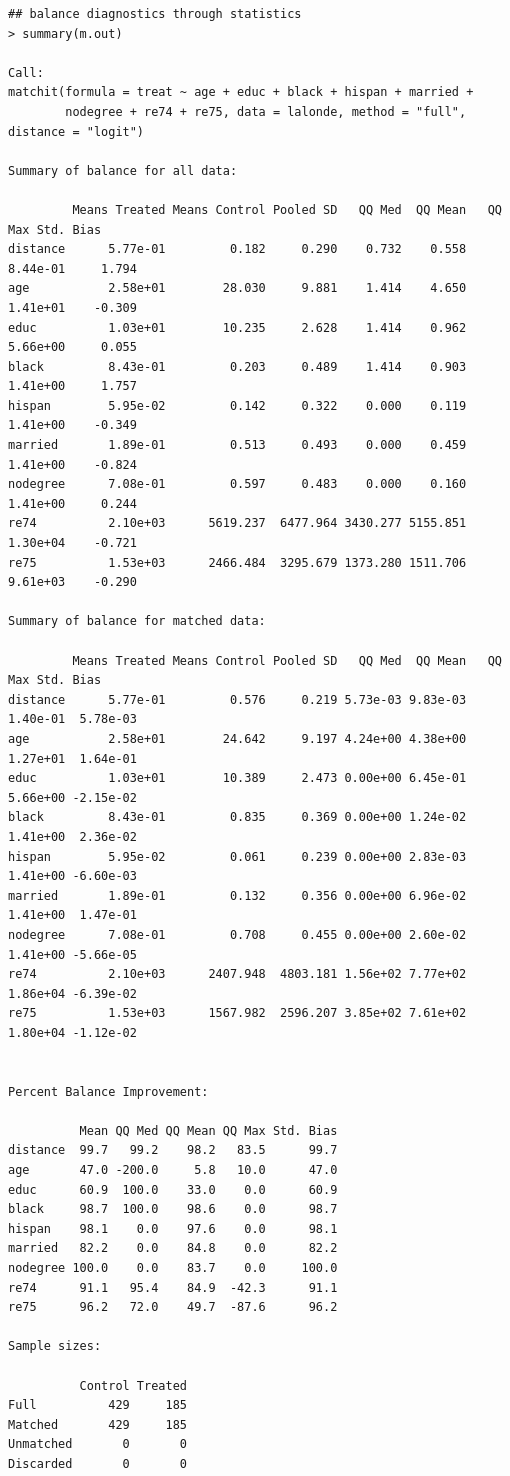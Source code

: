 \documentclass[oneside,letterpaper,titlepage]{article}
\begin{document}
\begin{verbatim}
## balance diagnostics through statistics
> summary(m.out)

Call: 
matchit(formula = treat ~ age + educ + black + hispan + married +   
        nodegree + re74 + re75, data = lalonde, method = "full", distance = "logit")

Summary of balance for all data:

         Means Treated Means Control Pooled SD   QQ Med  QQ Mean   QQ Max Std. Bias
distance      5.77e-01         0.182     0.290    0.732    0.558 8.44e-01     1.794
age           2.58e+01        28.030     9.881    1.414    4.650 1.41e+01    -0.309
educ          1.03e+01        10.235     2.628    1.414    0.962 5.66e+00     0.055
black         8.43e-01         0.203     0.489    1.414    0.903 1.41e+00     1.757
hispan        5.95e-02         0.142     0.322    0.000    0.119 1.41e+00    -0.349
married       1.89e-01         0.513     0.493    0.000    0.459 1.41e+00    -0.824
nodegree      7.08e-01         0.597     0.483    0.000    0.160 1.41e+00     0.244
re74          2.10e+03      5619.237  6477.964 3430.277 5155.851 1.30e+04    -0.721
re75          1.53e+03      2466.484  3295.679 1373.280 1511.706 9.61e+03    -0.290

Summary of balance for matched data:

         Means Treated Means Control Pooled SD   QQ Med  QQ Mean   QQ Max Std. Bias
distance      5.77e-01         0.576     0.219 5.73e-03 9.83e-03 1.40e-01  5.78e-03
age           2.58e+01        24.642     9.197 4.24e+00 4.38e+00 1.27e+01  1.64e-01
educ          1.03e+01        10.389     2.473 0.00e+00 6.45e-01 5.66e+00 -2.15e-02
black         8.43e-01         0.835     0.369 0.00e+00 1.24e-02 1.41e+00  2.36e-02
hispan        5.95e-02         0.061     0.239 0.00e+00 2.83e-03 1.41e+00 -6.60e-03
married       1.89e-01         0.132     0.356 0.00e+00 6.96e-02 1.41e+00  1.47e-01
nodegree      7.08e-01         0.708     0.455 0.00e+00 2.60e-02 1.41e+00 -5.66e-05
re74          2.10e+03      2407.948  4803.181 1.56e+02 7.77e+02 1.86e+04 -6.39e-02
re75          1.53e+03      1567.982  2596.207 3.85e+02 7.61e+02 1.80e+04 -1.12e-02
        

Percent Balance Improvement:

          Mean QQ Med QQ Mean QQ Max Std. Bias
distance  99.7   99.2    98.2   83.5      99.7
age       47.0 -200.0     5.8   10.0      47.0
educ      60.9  100.0    33.0    0.0      60.9
black     98.7  100.0    98.6    0.0      98.7
hispan    98.1    0.0    97.6    0.0      98.1
married   82.2    0.0    84.8    0.0      82.2
nodegree 100.0    0.0    83.7    0.0     100.0
re74      91.1   95.4    84.9  -42.3      91.1
re75      96.2   72.0    49.7  -87.6      96.2

Sample sizes:

          Control Treated
Full          429     185
Matched       429     185
Unmatched       0       0
Discarded       0       0
\end{verbatim}
\end{document}
